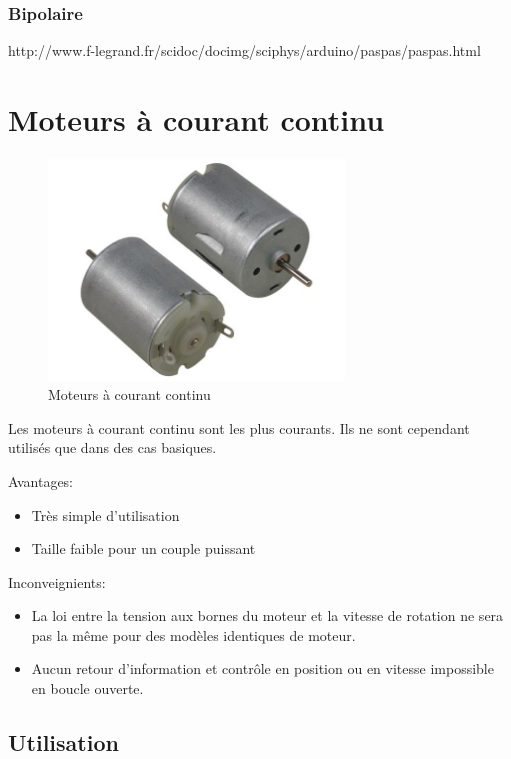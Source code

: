 \documentclass[a4paper, 11pt]{report}
\begin{document}
\subsubsection{Bipolaire}
http://www.f-legrand.fr/scidoc/docimg/sciphys/arduino/paspas/paspas.html

\section{Moteurs à courant continu}

\begin{figure}[h]
\begin{centering}
\includegraphics[width=0.7\textwidth]{images/MoteurDC.jpeg}
\caption{Moteurs à courant continu}
\par\end{centering}
\end{figure}

Les moteurs à courant continu sont les plus courants. Ils ne sont cependant utilisés que dans des cas basiques.

Avantages:
\begin{itemize}
\item Très simple d'utilisation
\item Taille faible pour un couple puissant
\end{itemize}

Inconveignients:
\begin{itemize}
\item La loi entre la tension aux bornes du moteur et la vitesse de rotation ne sera pas la même pour des modèles identiques de moteur.
\item Aucun retour d'information et contrôle en position ou en vitesse impossible en boucle ouverte.
\end{itemize}

\subsection{Utilisation}
\end{document}
